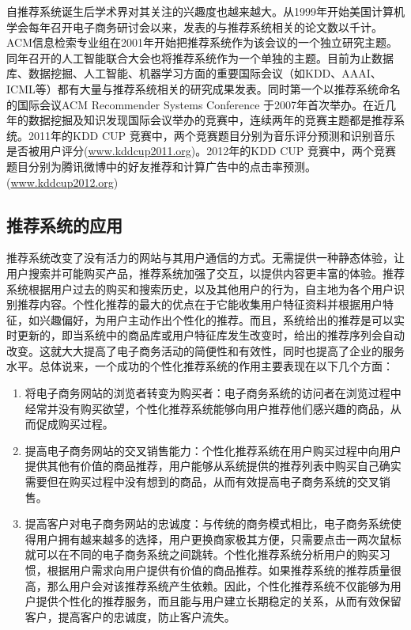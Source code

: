	自推荐系统诞生后学术界对其关注的兴趣度也越来越大。从1999年开始美国计算机学会每年召开电子商务研讨会以来，发表的与推荐系统相关的论文数以千计。ACM信息检索专业组在2001年开始把推荐系统作为该会议的一个独立研究主题。同年召开的人工智能联合大会也将推荐系统作为一个单独的主题。目前为止数据库、数据挖掘、人工智能、机器学习方面的重要国际会议（如KDD、AAAI、ICML等）都有大量与推荐系统相关的研究成果发表。同时第一个以推荐系统命名的国际会议ACM Recommender Systems Conference 于2007年首次举办。在近几年的数据挖掘及知识发现国际会议举办的竞赛中，连续两年的竞赛主题都是推荐系统。2011年的KDD CUP 竞赛中，两个竞赛题目分别为音乐评分预测和识别音乐是否被用户评分(\href{http://www.kdd.org/kdd2011/kddcup.shtml}{www.kddcup2011.org})。2012年的KDD CUP 竞赛中，两个竞赛题目分别为腾讯微博中的好友推荐和计算广告中的点击率预测。(\href{www.kddcup2012.org}{www.kddcup2012.org})

	\subsection{推荐系统的应用}
	推荐系统改变了没有活力的网站与其用户通信的方式。无需提供一种静态体验，让用户搜索并可能购买产品，推荐系统加强了交互，以提供内容更丰富的体验。推荐系统根据用户过去的购买和搜索历史，以及其他用户的行为，自主地为各个用户识别推荐内容。个性化推荐的最大的优点在于它能收集用户特征资料并根据用户特征，如兴趣偏好，为用户主动作出个性化的推荐。而且，系统给出的推荐是可以实时更新的，即当系统中的商品库或用户特征库发生改变时，给出的推荐序列会自动改变。这就大大提高了电子商务活动的简便性和有效性，同时也提高了企业的服务水平。总体说来，一个成功的个性化推荐系统的作用主要表现在以下几个方面：
	\begin{enumerate}[(1)]
	\item 将电子商务网站的浏览者转变为购买者：电子商务系统的访问者在浏览过程中经常并没有购买欲望，个性化推荐系统能够向用户推荐他们感兴趣的商品，从而促成购买过程。
	\item 提高电子商务网站的交叉销售能力：个性化推荐系统在用户购买过程中向用户提供其他有价值的商品推荐，用户能够从系统提供的推荐列表中购买自己确实需要但在购买过程中没有想到的商品，从而有效提高电子商务系统的交叉销售。
	\item 提高客户对电子商务网站的忠诚度：与传统的商务模式相比，电子商务系统使得用户拥有越来越多的选择，用户更换商家极其方便，只需要点击一两次鼠标就可以在不同的电子商务系统之间跳转。个性化推荐系统分析用户的购买习惯，根据用户需求向用户提供有价值的商品推荐。如果推荐系统的推荐质量很高，那么用户会对该推荐系统产生依赖。因此，个性化推荐系统不仅能够为用户提供个性化的推荐服务，而且能与用户建立长期稳定的关系，从而有效保留客户，提高客户的忠诚度，防止客户流失。
	\end{enumerate}

